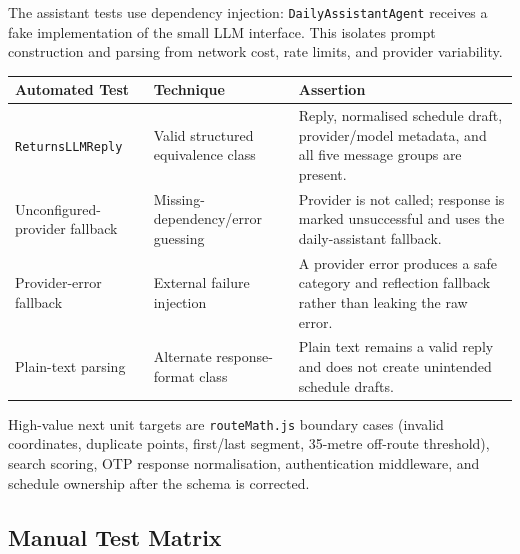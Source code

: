 \documentclass[11pt]{article}
\begin{document}
The assistant tests use dependency injection: \texttt{DailyAssistantAgent} receives a fake implementation of the small LLM interface. This isolates prompt construction and parsing from network cost, rate limits, and provider variability.

\begin{center}
\renewcommand{\arraystretch}{1.3}
\begin{tabularx}{\textwidth}{|L{0.30\textwidth}|L{0.25\textwidth}|X|}
\hline
\textbf{Automated Test} & \textbf{Technique} & \textbf{Assertion} \\
\hline
\texttt{ReturnsLLMReply} & Valid structured equivalence class & Reply, normalised schedule draft, provider/model metadata, and all five message groups are present. \\
\hline
Unconfigured-provider fallback & Missing-dependency/error guessing & Provider is not called; response is marked unsuccessful and uses the daily-assistant fallback. \\
\hline
Provider-error fallback & External failure injection & A provider error produces a safe category and reflection fallback rather than leaking the raw error. \\
\hline
Plain-text parsing & Alternate response-format class & Plain text remains a valid reply and does not create unintended schedule drafts. \\
\hline
\end{tabularx}
\end{center}

High-value next unit targets are \texttt{routeMath.js} boundary cases (invalid coordinates, duplicate points, first/last segment, 35-metre off-route threshold), search scoring, OTP response normalisation, authentication middleware, and schedule ownership after the schema is corrected.

\subsection*{Manual Test Matrix}
\end{document}
